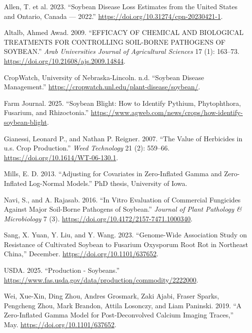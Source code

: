 \documentclass[
  10pt,
  letterpaper,
  twocolumn]{article}
\newlength{\cslhangindent}
\newlength{\cslentryspacingunit} %
\newenvironment{CSLReferences}[2] %
 {%
  \setlength{\parindent}{0pt}
  \ifodd #1
  \let\oldpar\par
  \def\par{\hangindent=\cslhangindent\oldpar}
  \fi
  \setlength{\parskip}{#2\cslentryspacingunit}
 }%
 {}
\begin{document}
\hypertarget{refs}{}
\begin{CSLReferences}{1}{0}
\leavevmode{}%
Allen, T. et al. 2023. {``Soybean Disease Loss Estimates from the United
States and Ontario, Canada --- 2022.''}
\url{https://doi.org/10.31274/cpn-20230421-1}.

\leavevmode{}%
Altalb, Ahmed Awad. 2009. {``EFFICACY OF CHEMICAL AND BIOLOGICAL
TREATMENTS FOR CONTROLLING SOIL-BORNE PATHOGENS OF SOYBEAN.''}
\emph{Arab Universities Journal of Agricultural Sciences} 17 (1):
163--73. \url{https://doi.org/10.21608/ajs.2009.14844}.

\leavevmode{}%
CropWatch, University of Nebraska-Lincoln. n.d. {``Soybean Disease
Management.''} \url{https://cropwatch.unl.edu/plant-disease/soybean/}.

\leavevmode{}%
Farm Journal. 2025. {``Soybean Blight: How to Identify Pythium,
Phytophthora, Fusarium, and Rhizoctonia.''}
\url{https://www.agweb.com/news/crops/how-identify-soybean-blight}.

\leavevmode{}%
Gianessi, Leonard P., and Nathan P. Reigner. 2007. {``The Value of
Herbicides in u.s. Crop Production.''} \emph{Weed Technology} 21 (2):
559--66. \url{https://doi.org/10.1614/WT-06-130.1}.

\leavevmode{}%
Mills, E. D. 2013. {``Adjusting for Covariates in Zero-Inflated Gamma
and Zero-Inflated Log-Normal Models.''} PhD thesis, University of Iowa.

\leavevmode{}%
Navi, S., and A. Rajasab. 2016. {``In Vitro Evaluation of Commercial
Fungicides Against Major Soil-Borne Pathogens of Soybean.''}
\emph{Journal of Plant Pathology \& Microbiology} 7 (3).
\url{https://doi.org/10.4172/2157-7471.1000340}.

\leavevmode{}%
Sang, X. Yuan, Y. Liu, and Y. Wang. 2023. {``Genome-Wide Association
Study on Resistance of Cultivated Soybean to Fusarium Oxysporum Root Rot
in Northeast China,''} December. \url{https://doi.org/10.1101/637652}.

\leavevmode{}%
USDA. 2025. {``Production - Soybeans.''}
\url{https://www.fas.usda.gov/data/production/commodity/2222000}.

\leavevmode{}%
Wei, Xue-Xin, Ding Zhou, Andres Grosmark, Zaki Ajabi, Fraser Sparks,
Pengcheng Zhou, Mark Brandon, Attila Losonczy, and Liam Paninski. 2019.
{``A Zero-Inflated Gamma Model for Post-Deconvolved Calcium Imaging
Traces,''} May. \url{https://doi.org/10.1101/637652}.

\end{CSLReferences}
\end{document}
